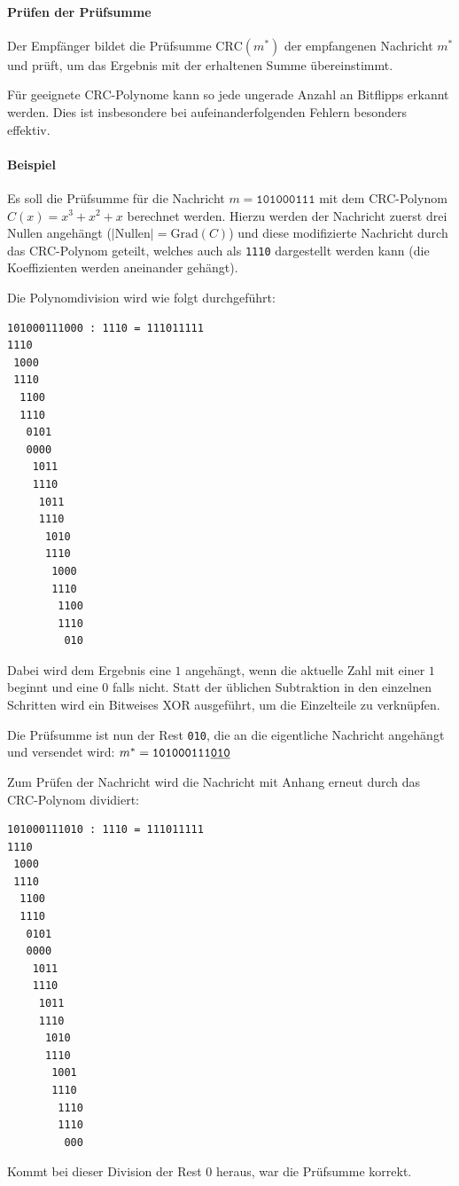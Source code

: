 \documentclass[a4paper, 11pt, accentcolor = tud3b]{tudreport}
\begin{document}
                \paragraph{Prüfen der Prüfsumme}
	                Der Empfänger bildet die Prüfsumme \( \textrm{CRC}(m^*) \) der empfangenen Nachricht \( m^* \) und prüft, um das Ergebnis mit der erhaltenen Summe übereinstimmt.
	                
	                Für geeignete CRC-Polynome kann so jede ungerade Anzahl an Bitflipps erkannt werden. Dies ist insbesondere bei aufeinanderfolgenden Fehlern besonders effektiv.
                
                \paragraph{Beispiel}
	                Es soll die Prüfsumme für die Nachricht \( m = \texttt{101000111} \) mit dem CRC-Polynom \( C(x) = x^3 + x^2 + x \) berechnet werden. Hierzu werden der Nachricht zuerst drei Nullen angehängt (\( \lvert\text{Nullen}\rvert = \text{Grad}(C) \)) und diese modifizierte Nachricht durch das CRC-Polynom geteilt, welches auch als \texttt{1110} dargestellt werden kann (die Koeffizienten werden aneinander gehängt).
	                
	                Die Polynomdivision wird wie folgt durchgeführt:
	                \begin{center}
	                	\begin{BVerbatim}
101000111000 : 1110 = 111011111
1110
 1000
 1110
  1100
  1110
   0101
   0000
    1011
    1110
     1011
     1110
      1010
      1110
       1000
       1110
        1100
        1110
         010
\end{BVerbatim}
	                \end{center}
	                Dabei wird dem Ergebnis eine \(1\) angehängt, wenn die aktuelle Zahl mit einer \(1\) beginnt und eine \(0\) falls nicht. Statt der üblichen Subtraktion in den einzelnen Schritten wird ein Bitweises XOR ausgeführt, um die Einzelteile zu verknüpfen.
	                
	                Die Prüfsumme ist nun der Rest \texttt{010}, die an die eigentliche Nachricht angehängt und versendet wird: \( m^* = \texttt{101000111\underline{010}} \)
	                
	                Zum Prüfen der Nachricht wird die Nachricht mit Anhang erneut durch das CRC-Polynom dividiert:
	                \begin{center}
	                	\begin{BVerbatim}
101000111010 : 1110 = 111011111
1110
 1000
 1110
  1100
  1110
   0101
   0000
    1011
    1110
     1011
     1110
      1010
      1110
       1001
       1110
        1110
        1110
         000
\end{BVerbatim}
	                \end{center}
	                Kommt bei dieser Division der Rest \(0\) heraus, war die Prüfsumme korrekt.
\end{document}

